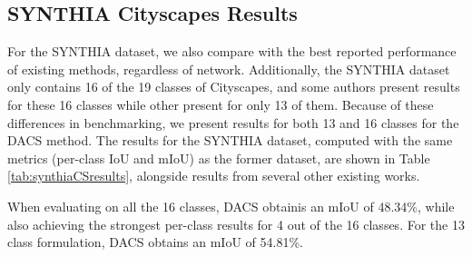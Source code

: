 \documentclass[10pt,twocolumn,letterpaper]{article}
\begin{document}
\subsection{SYNTHIA  Cityscapes Results}
For the SYNTHIA dataset, we also compare with the best reported performance of existing methods, regardless of network. Additionally, the SYNTHIA dataset only contains 16 of the 19 classes of Cityscapes, and some authors present results for these 16 classes while other present for only 13 of them. Because of these differences in benchmarking, we present results for both 13 and 16 classes for the DACS method. The results for the SYNTHIA dataset, computed with the same metrics (per-class IoU and mIoU) as the former dataset, are shown in Table \ref{tab:synthiaCSresults}, alongside results from several other existing works. 

When evaluating on all the 16 classes, DACS  obtainis an mIoU of 48.34\%, while also achieving the strongest per-class results for 4 out of the 16 classes. For the 13 class formulation, DACS obtains an mIoU of 54.81\%.
\end{document}
